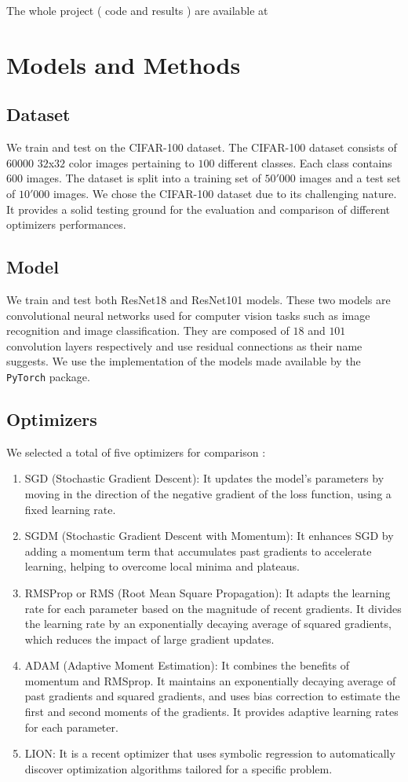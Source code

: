 \documentclass[10pt,conference,compsocconf]{IEEEtran}
\begin{document}
The whole project ( code and results ) are available at 

\section{Models and Methods}
\subsection{Dataset}
We train and test on the CIFAR-100 \cite{cifar100} dataset. The CIFAR-100 dataset consists of $60 000$ $32$x$32$ color images pertaining to $100$ different classes. Each class contains $600$ images. The dataset is split into a training set of $50'000$ images and a test set of $10'000$ images. We chose the CIFAR-100 dataset due to its challenging nature. It provides a solid testing ground for the evaluation and comparison of different optimizers performances.

\subsection{Model}
We train and test both ResNet18 and ResNet101 models. These two models are convolutional neural networks used for computer vision tasks such as image recognition and image classification. They are composed of $18$ and $101$ convolution layers respectively and use residual connections as their name suggests. We use the implementation of the models made available by the \verb+PyTorch+ package.

\subsection{Optimizers}
We selected a total of five optimizers for comparison \cite{optimizers}:
\begin{enumerate}
  \item SGD (Stochastic Gradient Descent): It updates the model's parameters by moving in the direction of the negative gradient of the loss function, using a fixed learning rate.
  \item SGDM  (Stochastic Gradient Descent with Momentum): It enhances SGD by adding a momentum term that accumulates past gradients to accelerate learning, helping to overcome local minima and plateaus.
  \item RMSProp or RMS (Root Mean Square Propagation): It adapts the learning rate for each parameter based on the magnitude of recent gradients. It divides the learning rate by an exponentially decaying average of squared gradients, which reduces the impact of large gradient updates.
  \item ADAM  (Adaptive Moment Estimation): It combines the benefits of momentum and RMSprop. It maintains an exponentially decaying average of past gradients and squared gradients, and uses bias correction to estimate the first and second moments of the gradients. It provides adaptive learning rates for each parameter.
  \item LION: It is a recent optimizer that uses symbolic regression to automatically discover optimization algorithms tailored for a specific problem.
\end{enumerate}
\end{document}
